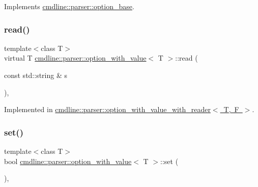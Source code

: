 Implements \mbox{\hyperlink{classcmdline_1_1parser_1_1option__base_a30b43cdce34669f4cbc7de9d506416e7}{cmdline\+::parser\+::option\+\_\+base}}.

\mbox{\label{classcmdline_1_1parser_1_1option__with__value_acb922af893f383b1e00d355d7f3b6b75}} 
\subsubsection{\texorpdfstring{read()}{read()}}
{\footnotesize\ttfamily template$<$class T$>$ \\
virtual T \mbox{\hyperlink{classcmdline_1_1parser_1_1option__with__value}{cmdline\+::parser\+::option\+\_\+with\+\_\+value}}$<$ T $>$\+::read (\begin{DoxyParamCaption}\item[{const std\+::string \&}]{s }\end{DoxyParamCaption})\hspace{0.3cm}{\ttfamily [protected]}, {}}



Implemented in \mbox{\hyperlink{classcmdline_1_1parser_1_1option__with__value__with__reader_a47db1ae274bc54b14d8f4e414ce3549a}{cmdline\+::parser\+::option\+\_\+with\+\_\+value\+\_\+with\+\_\+reader$<$ T, F $>$}}.

\mbox{\label{classcmdline_1_1parser_1_1option__with__value_a6bdd4adfe3afff3fe0d0c57d2259a969}} 
\subsubsection{\texorpdfstring{set()}{set()}\hspace{0.1cm}{\footnotesize\ttfamily [1/2]}}
{\footnotesize\ttfamily template$<$class T$>$ \\
bool \mbox{\hyperlink{classcmdline_1_1parser_1_1option__with__value}{cmdline\+::parser\+::option\+\_\+with\+\_\+value}}$<$ T $>$\+::set (\begin{DoxyParamCaption}{ }\end{DoxyParamCaption})\hspace{0.3cm}{\ttfamily [inline]}, {\ttfamily [virtual]}}



